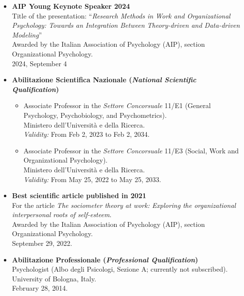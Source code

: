 \documentclass[hidelinks, letterpaper,10pt]{article} %
\begin{document}
\begin{itemize}

	\item \textbf{AIP Young Keynote Speaker 2024} \\
	Title of the presentation: ``\textit{Research Methods in Work and Organizational Psychology: Towards an Integration Between Theory-driven and Data-driven Modeling}'' \\
	Awarded by the Italian Association of Psychology (AIP), section Organizational Psychology.\\
	2024, September 4
	

	
	\item \textbf{Abilitazione Scientifica Nazionale (\textit{National Scientific Qualification})}
	
	\begin{itemize}	
	\item Associate Professor in the \textit{Settore Concorsuale} 11/E1 (General Psychology, Psychobiology, and Psychometrics). \\
    Ministero dell'Università e della Ricerca. \\
    \textit{Validity:} From Feb 2, 2023 to Feb 2, 2034.	
	\end{itemize}
	
	\begin{itemize}
	\item Associate Professor in the \textit{Settore Concorsuale} 11/E3 (Social, Work and Organizational Psychology). \\
    Ministero dell'Università e della Ricerca. \\
    \textit{Validity:} From May 25, 2022 to May 25, 2033.
	\end{itemize}		
	

    
    \item \textbf{Best scientific article published in 2021} \\ For the article \textit{The sociometer theory at work: Exploring the organizational interpersonal roots of self-esteem}.\\
    Awarded by the Italian Association of Psychology (AIP), section Organizational Psychology.\\
    September 29, 2022.
    
    
    \item \textbf{Abilitazione Professionale (\textit{Professional Qualification})} \\
    Psychologist (Albo degli Psicologi, Sezione A; currently not subscribed). \\
    University of Bologna, Italy.\\
    February 28, 2014.
    
\end{itemize}
\end{document}
